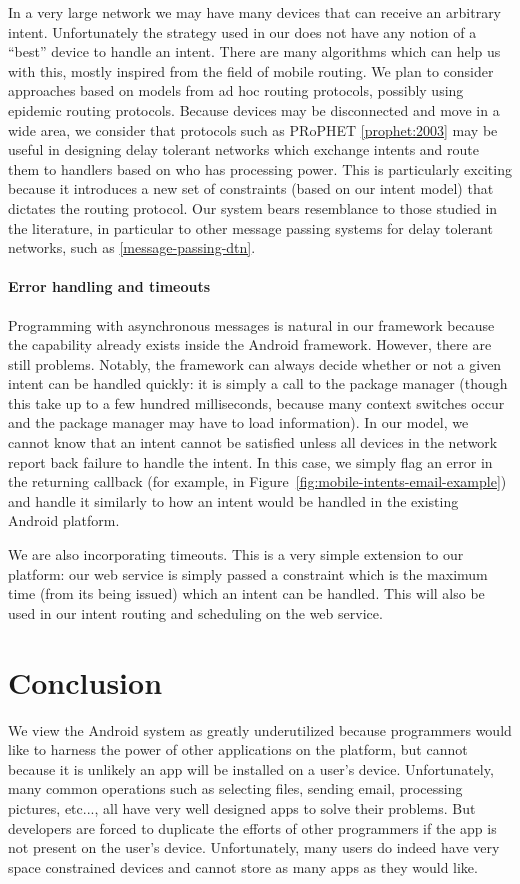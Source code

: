 \documentclass{acm_proc_article-sp}
\begin{document}
In a very large network we may have many devices that can receive an
arbitrary intent.  Unfortunately the strategy used in our does not
have any notion of a ``best'' device to handle an intent.  There are
many algorithms which can help us with this, mostly inspired from the
field of mobile routing.  We plan to consider approaches based on
models from ad hoc routing protocols, possibly using epidemic routing
protocols.  Because devices may be disconnected and move in a wide
area, we consider that protocols such as PRoPHET \ref{prophet:2003}
may be useful in designing delay tolerant networks which exchange
intents and route them to handlers based on who has processing power.
This is particularly exciting because it introduces a new set of
constraints (based on our intent model) that dictates the routing
protocol.  Our system bears resemblance to those studied in the
literature, in particular to other message passing systems for delay
tolerant networks, such as \ref{message-passing-dtn}.

\paragraph{Error handling and timeouts} 

Programming with asynchronous messages is natural in our framework
because the capability already exists inside the Android framework.
However, there are still problems.  Notably, the framework can always
decide whether or not a given intent can be handled quickly: it is
simply a call to the package manager (though this take up to a few
hundred milliseconds, because many context switches occur and the
package manager may have to load information).  In our model, we
cannot know that an intent cannot be satisfied unless all devices in
the network report back failure to handle the intent.  In this case,
we simply flag an error in the returning callback (for example, in
Figure~\ref{fig:mobile-intents-email-example}) and handle it similarly
to how an intent would be handled in the existing Android platform.

We are also incorporating timeouts.  This is a very simple extension
to our platform: our web service is simply passed a constraint which
is the maximum time (from its being issued) which an intent can be
handled.  This will also be used in our intent routing and scheduling
on the web service.

\section{Conclusion}
We view the Android system as greatly underutilized because
programmers would like to harness the power of other applications on
the platform, but cannot because it is unlikely an app will be
installed on a user's device.  Unfortunately, many common operations
such as selecting files, sending email, processing pictures, etc...,
all have very well designed apps to solve their problems.  But
developers are forced to duplicate the efforts of other programmers if
the app is not present on the user's device.  Unfortunately, many
users do indeed have very space constrained devices and cannot store
as many apps as they would like.
\end{document}
